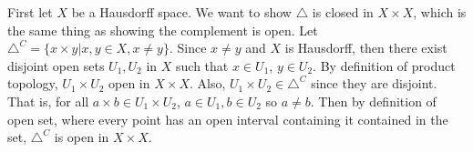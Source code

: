 \documentclass[12pt]{article}
\newenvironment{solution}[1][Solution]
{
	\begin{trivlist} 
		\item[\hskip \labelsep {\itshape #1:}]
	}
	{
	\end{trivlist}
}
\begin{document}
\begin{solution}
First let $X$ be a Hausdorff space. We want to show $\triangle$ is closed in $X \times X$, which is the same thing as showing the complement is open. Let $\triangle^C = \lbrace{x \times y | x,y \in X, x \neq y\rbrace}$. Since $x \neq y$ and $X$ is Hausdorff, then there exist disjoint open sets $U_1, U_2$ in $X$ such that $x \in U_1$, $y \in U_2$. By definition of product topology, $U_1 \times U_2$ open in $X \times X$. Also, $U_1 \times U_2 \in \triangle ^C$ since they are disjoint. That is, for all $a \times b \in U_1 \times U_2$, $a \in U_1, b \in U_2$ so $a \neq b$. Then by definition of open set, where every point has an open interval containing it contained in the set, $\triangle^C$ is open in $X \times X$. 
\end{solution}
\end{document}

